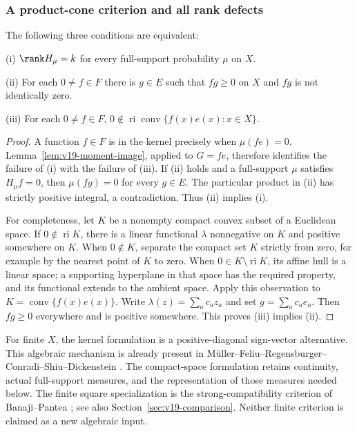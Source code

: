 \subsubsection{A product-cone criterion and all rank defects}
\begin{theorem}
\label{thm:v19-rectangular}
The following three conditions are equivalent:

\smallskip\noindent\textup{(i)}
$\rank H_\mu=k$ for every full-support probability $\mu$ on $X$.

\smallskip\noindent\textup{(ii)}
For each $0\ne f\in F$ there is $g\in E$ such that $fg\ge0$ on
$X$ and $fg$ is not identically zero.

\smallskip\noindent\textup{(iii)}
For each $0\ne f\in F$,
$0\notin\operatorname{ri}\operatorname{conv}\{f(x)e(x):x\in X\}$.
\end{theorem}
\begin{proof}
A function $f\in F$ is in the kernel precisely when
$\mu(f e)=0$. Lemma~\ref{lem:v19-moment-image}, applied to $G=f e$,
therefore identifies the failure of (i) with the failure of (iii).
If (ii) holds and a full-support $\mu$ satisfies $H_\mu f=0$, then
$\mu(fg)=0$ for every $g\in E$. The particular product in (ii) has
strictly positive integral, a contradiction. Thus (ii) implies (i).

For completeness, let $K$ be a nonempty compact convex subset of a
Euclidean space. If $0\notin\operatorname{ri}K$, there is a linear
functional $\lambda$ nonnegative on $K$ and positive somewhere on
$K$. When $0\notin K$, separate the compact set $K$ strictly from
zero, for example by the nearest point of $K$ to zero. When
$0\in K\setminus\operatorname{ri}K$, its affine hull is a linear
space; a supporting hyperplane in that space has the required property,
and its functional extends to the ambient space. Apply this observation
to $K=\operatorname{conv}\{f(x)e(x)\}$. Write
$\lambda(z)=\sum_a c_a z_a$ and set $g=\sum_a c_a e_a$. Then
$fg\ge0$ everywhere and is positive somewhere. This proves (iii)
implies (ii).
\end{proof}

For finite $X$, the kernel formulation is a positive-diagonal
sign-vector alternative. This algebraic mechanism is already present
in M\"uller--Feliu--Regensburger--Conradi--Shiu--Dickenstein
\cite[Lemma 2.1]{MullerEtAl2016}. The compact-space formulation retains
continuity, actual full-support measures, and the representation of
those measures needed below. The finite square specialization is the
strong-compatibility criterion of Banaji--Pantea
\cite[Definition 2.24 and Lemma 2.36]{BanajiPantea2016}; see also
Section~\ref{sec:v19-comparison}. Neither finite criterion is claimed
as a new algebraic input.

